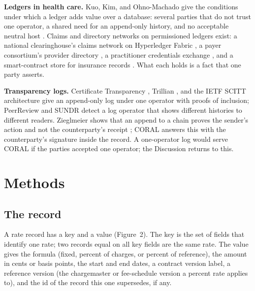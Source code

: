 \documentclass[10pt]{article}
\begin{document}
\textbf{Ledgers in health care.} Kuo, Kim, and Ohno-Machado give the conditions under which a ledger adds value over a database: several parties that do not trust one operator, a shared need for an append-only history, and no acceptable neutral host \cite{kuo2017}. Claims and directory networks on permissioned ledgers exist: a national clearinghouse's claims network on Hyperledger Fabric \cite{change2018}, a payer consortium's provider directory \cite{synaptic}, a practitioner credentials exchange \cite{procredex}, and a smart-contract store for insurance records \cite{mistore2018}. What each holds is a fact that one party asserts.

\textbf{Transparency logs.} Certificate Transparency \cite{ct,rfc6962}, Trillian \cite{trillian}, and the IETF SCITT architecture \cite{scitt} give an append-only log under one operator with proofs of inclusion; PeerReview \cite{peerreview} and SUNDR \cite{sundr} detect a log operator that shows different histories to different readers. Zieglmeier shows that an append to a chain proves the sender's action and not the counterparty's receipt \cite{zieglmeier2023}; CORAL answers this with the counterparty's signature inside the record. A one-operator log would serve CORAL if the parties accepted one operator; the Discussion returns to this.

\section*{Methods}

\subsection*{The record}

A rate record has a key and a value (Figure~2). The key is the set of fields that identify one rate; two records equal on all key fields are the same rate. The value gives the formula (fixed, percent of charges, or percent of reference), the amount in cents or basis points, the start and end dates, a contract version label, a reference version (the chargemaster or fee-schedule version a percent rate applies to), and the id of the record this one supersedes, if any.
\end{document}
